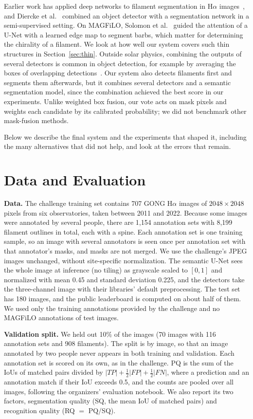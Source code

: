 \documentclass[conference]{IEEEtran}
\begin{document}
Earlier work has applied deep networks to filament segmentation in H$\alpha$ images~\cite{ahmadzadeh2019toward,zhu2019recognition,guo2022detection}, and Diercke et al.~\cite{diercke2024universal} combined an object detector with a segmentation network in a semi-supervised setting. On MAGFiLO, Solomon et al.~\cite{solomon2025edgeattnet} guided the attention of a U-Net with a learned edge map to segment barbs, which matter for determining the chirality of a filament. We look at how well our system covers such thin structures in Section~\ref{sec:thin}. Outside solar physics, combining the outputs of several detectors is common in object detection, for example by averaging the boxes of overlapping detections~\cite{solovyev2021wbf}. Our system also detects filaments first and segments them afterwards, but it combines several detectors and a semantic segmentation model, since the combination achieved the best score in our experiments. Unlike weighted box fusion, our vote acts on mask pixels and weights each candidate by its calibrated probability; we did not benchmark other mask-fusion methods.

Below we describe the final system and the experiments that shaped it, including the many alternatives that did not help, and look at the errors that remain.
\section{Data and Evaluation}
\label{sec:data}
\textbf{Data.} The challenge training set contains 707 GONG H$\alpha$ images of $2048\times2048$ pixels from six observatories, taken between 2011 and 2022. Because some images were annotated by several people, there are 1,154 annotation sets with 8,199 filament outlines in total, each with a spine. Each annotation set is one training sample, so an image with several annotators is seen once per annotation set with that annotator's masks, and masks are not merged. We use the challenge's JPEG images unchanged, without site-specific normalization. The semantic U-Net sees the whole image at inference (no tiling) as grayscale scaled to $[0,1]$ and normalized with mean 0.45 and standard deviation 0.225, and the detectors take the three-channel image with their libraries' default preprocessing. The test set has 180 images, and the public leaderboard is computed on about half of them. We used only the training annotations provided by the challenge and no MAGFiLO annotations of test images.

\textbf{Validation split.} We held out 10\% of the images (70 images with 116 annotation sets and 908 filaments). The split is by image, so that an image annotated by two people never appears in both training and validation. Each annotation set is scored on its own, as in the challenge. PQ is the sum of the IoUs of matched pairs divided by $|TP|+\frac12|FP|+\frac12|FN|$, where a prediction and an annotation match if their IoU exceeds 0.5, and the counts are pooled over all images, following the organizers' evaluation notebook. We also report its two factors, segmentation quality (SQ, the mean IoU of matched pairs) and recognition quality (RQ $=$ PQ/SQ).
\end{document}
